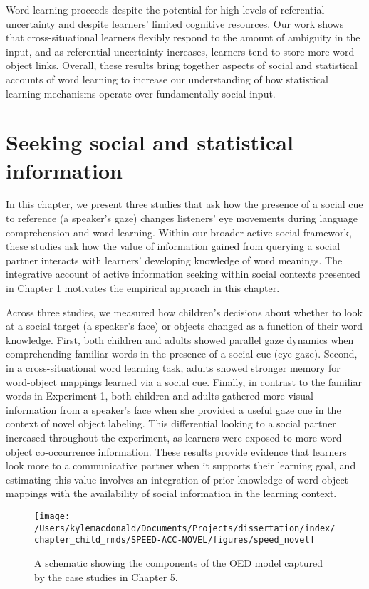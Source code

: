 \documentclass[oneside]{report}
\begin{document}
Word learning proceeds despite the potential for high levels of
referential uncertainty and despite learners' limited cognitive
resources. Our work shows that cross-situational learners flexibly
respond to the amount of ambiguity in the input, and as referential
uncertainty increases, learners tend to store more word-object links.
Overall, these results bring together aspects of social and statistical
accounts of word learning to increase our understanding of how
statistical learning mechanisms operate over fundamentally social input.

\chapter{Seeking social and statistical
information}\label{seeking-social-and-statistical-information}

In this chapter, we present three studies that ask how the presence of a
social cue to reference (a speaker's gaze) changes listeners' eye
movements during language comprehension and word learning. Within our
broader active-social framework, these studies ask how the value of
information gained from querying a social partner interacts with
learners' developing knowledge of word meanings. The integrative account
of active information seeking within social contexts presented in
Chapter 1 motivates the empirical approach in this chapter.

Across three studies, we measured how children's decisions about whether
to look at a social target (a speaker's face) or objects changed as a
function of their word knowledge. First, both children and adults showed
parallel gaze dynamics when comprehending familiar words in the presence
of a social cue (eye gaze). Second, in a cross-situational word learning
task, adults showed stronger memory for word-object mappings learned via
a social cue. Finally, in contrast to the familiar words in Experiment
1, both children and adults gathered more visual information from a
speaker's face when she provided a useful gaze cue in the context of
novel object labeling. This differential looking to a social partner
increased throughout the experiment, as learners were exposed to more
word-object co-occurrence information. These results provide evidence
that learners look more to a communicative partner when it supports
their learning goal, and estimating this value involves an integration
of prior knowledge of word-object mappings with the availability of
social information in the learning context.
\begin{figure}[t]

{\centering \texttt{[image: /Users/kylemacdonald/Documents/Projects/dissertation/index/chapter\_child\_rmds/SPEED-ACC-NOVEL/figures/speed\_novel]} 

}

\caption[Overview of Chapter 5.]{A schematic showing the components of the OED model captured by the case studies in Chapter 5.}\label{fig:schematic-speed-novel}
\end{figure}
\end{document}
